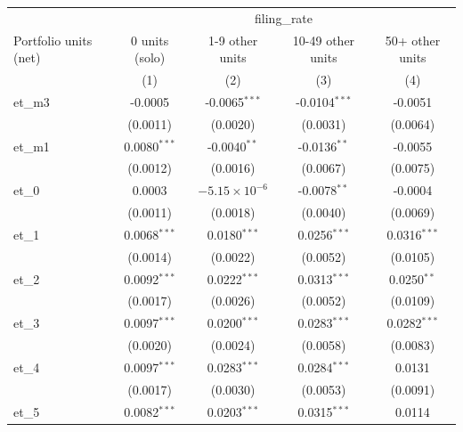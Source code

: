 
\begingroup
\centering
\begin{tabular}{lcccc}
   \toprule
    & \multicolumn{4}{c}{filing\_rate}\\
   Portfolio units (net) & 0 units (solo) & 1-9 other units        & 10-49 other units & 50+ other units \\   
                         & (1)            & (2)                    & (3)               & (4)\\  
   \midrule 
   et\_m3                & -0.0005        & -0.0065$^{***}$        & -0.0104$^{***}$   & -0.0051\\   
                         & (0.0011)       & (0.0020)               & (0.0031)          & (0.0064)\\   
   et\_m1                & 0.0080$^{***}$ & -0.0040$^{**}$         & -0.0136$^{**}$    & -0.0055\\   
                         & (0.0012)       & (0.0016)               & (0.0067)          & (0.0075)\\   
   et\_0                 & 0.0003         & $-5.15\times 10^{-6}$  & -0.0078$^{**}$    & -0.0004\\   
                         & (0.0011)       & (0.0018)               & (0.0040)          & (0.0069)\\   
   et\_1                 & 0.0068$^{***}$ & 0.0180$^{***}$         & 0.0256$^{***}$    & 0.0316$^{***}$\\   
                         & (0.0014)       & (0.0022)               & (0.0052)          & (0.0105)\\   
   et\_2                 & 0.0092$^{***}$ & 0.0222$^{***}$         & 0.0313$^{***}$    & 0.0250$^{**}$\\   
                         & (0.0017)       & (0.0026)               & (0.0052)          & (0.0109)\\   
   et\_3                 & 0.0097$^{***}$ & 0.0200$^{***}$         & 0.0283$^{***}$    & 0.0282$^{***}$\\   
                         & (0.0020)       & (0.0024)               & (0.0058)          & (0.0083)\\   
   et\_4                 & 0.0097$^{***}$ & 0.0283$^{***}$         & 0.0284$^{***}$    & 0.0131\\   
                         & (0.0017)       & (0.0030)               & (0.0053)          & (0.0091)\\   
   et\_5                 & 0.0082$^{***}$ & 0.0203$^{***}$         & 0.0315$^{***}$    & 0.0114\\   

\end{tabular}
